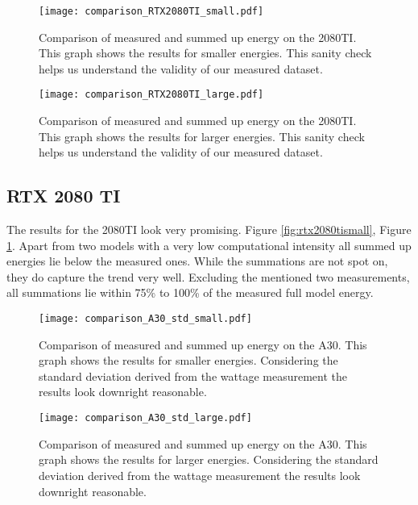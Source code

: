 \documentclass[conference]{IEEEtran}
\begin{document}
\begin{figure}
    \texttt{[image: comparison\_RTX2080TI\_small.pdf]}
    \caption{Comparison of measured and summed up energy on the 2080TI. This graph shows the results for smaller energies. This sanity check helps us understand the validity of our measured dataset.}
    \label{fig:rtx2080tismall}
    \texttt{[image: comparison\_RTX2080TI\_large.pdf]}
    \caption{Comparison of measured and summed up energy on the 2080TI. This graph shows the results for larger energies. This sanity check helps us understand the validity of our measured dataset.}
    \label{fig:rtx2080tilarge}
\end{figure}

\subsection{RTX 2080 TI}
The results for the 2080TI look very promising. Figure \ref{fig:rtx2080tismall}, Figure \ref{fig:rtx2080tilarge}. Apart from two models with a very low computational intensity all summed up energies lie below the measured ones. While the summations are not spot on, they do capture the trend very well. Excluding the mentioned two measurements, all summations lie within 75\% to 100\% of the measured full model energy.

\begin{figure}
    \texttt{[image: comparison\_A30\_std\_small.pdf]}
    \caption{Comparison of measured and summed up energy on the A30. This graph shows the results for smaller energies. Considering the standard deviation derived from the wattage measurement the results look downright reasonable.}
    \label{fig:a30small}
    \texttt{[image: comparison\_A30\_std\_large.pdf]}
    \caption{Comparison of measured and summed up energy on the A30. This graph shows the results for larger energies. Considering the standard deviation derived from the wattage measurement the results look downright reasonable.}
    \label{fig:a30large}
\end{figure}

\end{document}
